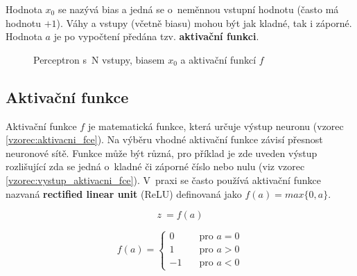 Hodnota $x_0$ se nazývá bias a jedná se o~neměnnou vstupní hodnotu (často má hodnotu $+1$). Váhy a vstupy (včetně biasu) mohou být jak kladné, tak i záporné. Hodnota $a$ je po vypočtení předána tzv. \textbf{aktivační funkci}.

\begin{figure}[H]
  \begin{center}
  \label{obrazek:perceptron}
  \caption{Perceptron s~N vstupy, biasem $x_0$ a aktivační funkcí $f$}
  \end{center}
\end{figure}

\subsection*{Aktivační funkce}
Aktivační funkce $f$ je matematická funkce, která určuje výstup neuronu (vzorec \ref{vzorec:aktivacni_fce}). Na výběru vhodné aktivační funkce závisí přesnost neuronové sítě. Funkce může být různá, pro příklad je zde uveden výstup rozlišující zda se jedná o~kladné či záporné číslo nebo nulu (viz vzorec \ref{vzorec:vystup_aktivacni_fce}). V~praxi se často používá aktivační funkce nazvaná \textbf{rectified linear unit} (ReLU) \cite{deeplearningbook} definovaná jako $f(a) = max\{0, a\}$.

\begin{equation} \label{vzorec:aktivacni_fce}
  z~= f(a)
\end{equation}

\begin{equation}
  \label{vzorec:vystup_aktivacni_fce}
   f(a) =
    \begin{cases}
      0       & \quad \text{pro } a = 0\\
      1       & \quad \text{pro } a > 0\\
      -1       & \quad \text{pro } a < 0
    \end{cases}
\end{equation}

